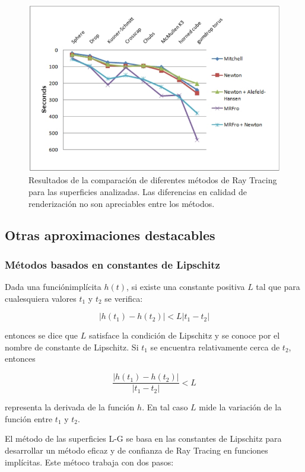 \begin{figure}[h]
	\centering
	\includegraphics[scale=0.5]{images/florez8.png}
	\caption{Resultados de la comparación de diferentes métodos de Ray Tracing para las superficies analizadas. Las diferencias en calidad de renderización no son apreciables entre los métodos.}
	\label{florez410}
\end{figure}

\subsection{Otras aproximaciones destacables}

\subsubsection{Métodos basados en constantes de Lipschitz}

Dada una funciónimplícita $h(t)$, si existe una constante positiva $L$ tal que para cualesquiera valores $t_1$ y $t_2$ se verifica:

\begin{equation}
|h(t_1) - h(t_2)| < L |t_1 - t_2|
\nonumber
\end{equation}

entonces se dice que $L$ satisface la condición de Lipschitz y se conoce por el nombre de constante de Lipschitz. Si $t_1$ se encuentra relativamente cerca de $t_2$, entonces

\begin{equation}
\frac{|h(t_1) - h(t_2)|}{|t_1 - t_2|} < L
\nonumber
\end{equation}

representa la derivada de la función $h$. En tal caso $L$ mide la variación de la función entre $t_1$ y $t_2$.
\par El método de las superficies L-G \cite{Kalra89} se basa en las constantes de Lipschitz para desarrollar un método eficaz y de confianza de Ray Tracing en funciones implícitas. Este métoco trabaja con dos pasos:


